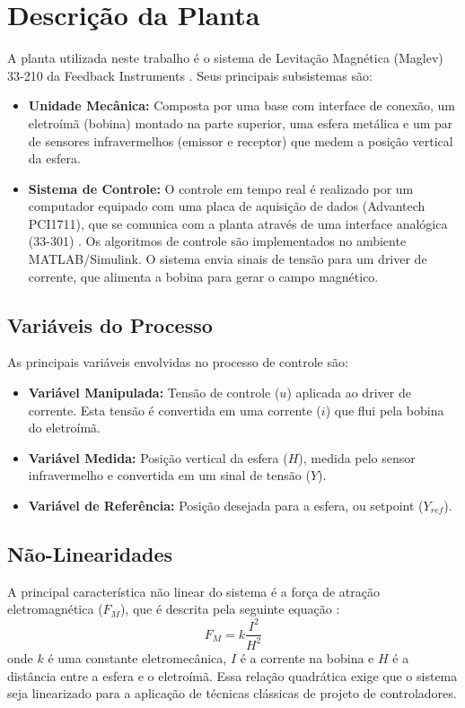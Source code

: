 \section{Descrição da Planta}

A planta utilizada neste trabalho é o sistema de Levitação Magnética (Maglev) 33-210 da Feedback Instruments \cite{feedback2006install}. Seus principais subsistemas são:

\begin{itemize}
    \item \textbf{Unidade Mecânica:} Composta por uma base com interface de conexão, um eletroímã (bobina) montado na parte superior, uma esfera metálica e um par de sensores infravermelhos (emissor e receptor) que medem a posição vertical da esfera.
    \item \textbf{Sistema de Controle:} O controle em tempo real é realizado por um computador equipado com uma placa de aquisição de dados (Advantech PCI1711), que se comunica com a planta através de uma interface analógica (33-301) \cite{feedback2006install}. Os algoritmos de controle são implementados no ambiente MATLAB/Simulink. O sistema envia sinais de tensão para um driver de corrente, que alimenta a bobina para gerar o campo magnético.
\end{itemize}

\subsection{Variáveis do Processo}
As principais variáveis envolvidas no processo de controle são:
\begin{itemize}
    \item \textbf{Variável Manipulada:} Tensão de controle ($u$) aplicada ao driver de corrente. Esta tensão é convertida em uma corrente ($i$) que flui pela bobina do eletroímã.
    \item \textbf{Variável Medida:} Posição vertical da esfera ($H$), medida pelo sensor infravermelho e convertida em um sinal de tensão ($Y$).
    \item \textbf{Variável de Referência:} Posição desejada para a esfera, ou setpoint ($Y_{ref}$).
\end{itemize}

\subsection{Não-Linearidades}
A principal característica não linear do sistema é a força de atração eletromagnética ($F_M$), que é descrita pela seguinte equação \cite{kawakami2003,feedback2006control}:
\begin{equation}
    F_{M} = k \frac{I^{2}}{H^{2}}
    \label{eq:forca_magnetica}
\end{equation}
onde $k$ é uma constante eletromecânica, $I$ é a corrente na bobina e $H$ é a distância entre a esfera e o eletroímã. Essa relação quadrática exige que o sistema seja linearizado para a aplicação de técnicas clássicas de projeto de controladores.